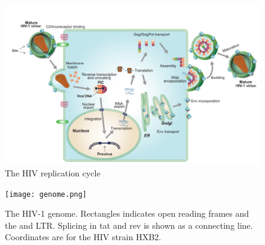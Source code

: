\documentclass[../sherrill-Mix_thesis.tex]{subfiles}
\begin{document}
\begin{figure}
	\centering
	\includegraphics[width=\textwidth]{lifecycle.pdf} %
	\caption[The HIV replication cycle]{The HIV replication cycle} %
	\label{figHIVLifecycle}
\end{figure}

\begin{figure}
	\centering
	\texttt{[image: genome.png]} %
	\caption[The HIV-1 genome]{The HIV-1 genome. Rectangles indicates open reading frames and the \fivePrime{} and \threePrime{} LTR. Splicing in tat and rev is shown as a connecting line. Coordinates are for the HIV strain HXB2.}
	\label{figHIVGenome}
\end{figure}
\end{document}
